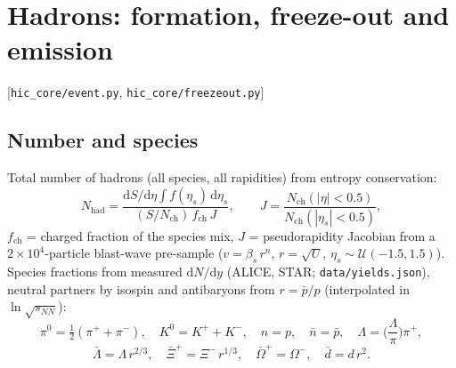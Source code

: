 \documentclass[11pt,a4paper]{article}
\newcommand{\file}[1]{\texttt{\small #1}}
\newcommand{\src}[1]{\hfill{\small\color{gray}[#1]}}
\begin{document}
\section{Hadrons: formation, freeze-out and emission}
\src{\file{hic\_core/event.py}, \file{hic\_core/freezeout.py}}

\subsection{Number and species}
Total number of hadrons (all species, all rapidities) from entropy conservation:
\begin{equation}
N_\text{had} = \frac{\mathrm dS/\mathrm d\eta \int f(\eta_s)\,\mathrm d\eta_s}{(S/N_\text{ch})\,f_\text{ch}\,J},\qquad
J = \frac{N_\text{ch}(|\eta|<0.5)}{N_\text{ch}(|\eta_s|<0.5)},
\end{equation}
$f_\text{ch}$ = charged fraction of the species mix, $J$ = pseudorapidity Jacobian from a $2\times10^4$-particle
blast-wave pre-sample ($v = \beta_s\,r^n$, $r=\sqrt U$, $\eta_s\sim\mathcal U(-1.5,1.5)$).
Species fractions from measured $\mathrm dN/\mathrm dy$ (ALICE, STAR; \file{data/yields.json}), neutral partners by
isospin and antibaryons from $r=\bar p/p$ (interpolated in $\ln\sqrt{s_{NN}}$):
\begin{equation}
\pi^0 = \tfrac12(\pi^++\pi^-),\quad K^0 = K^++K^-,\quad n=p,\quad \bar n=\bar p,\quad
\Lambda = \Big(\frac{\Lambda}{\pi}\Big)\pi^+,
\end{equation}
\begin{equation}
\bar\Lambda = \Lambda\,r^{2/3},\quad \bar\Xi^+ = \Xi^-\,r^{1/3},\quad \bar\Omega^+ = \Omega^-,\quad \bar d = d\,r^2 .
\end{equation}
\end{document}
